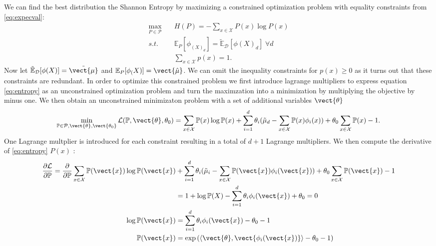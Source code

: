     We can find the best distribution \wrt the Shannon Entropy by maximizing a constrained optimization problem with equality constraints from \eq\ref{eq:expecval}:
    \begin{equation}
        \label{eq:entropy}
        \begin{split}
            \max_{P\in \mathcal{P}} \quad & H(P) = - \sum_{x\in\mathcal{X}} P(x) \log P(x) \\
            s.t. \quad & \mathbb{E}_P[\phi_(X)_d] = \tilde{\mathbb{E}}_{\mathcal{D}}[\phi(X)_d]  \; \forall d\\
            & \sum_{x\in \mathcal{X}} p(x) = 1.
        \end{split}
    \end{equation}
    Now let $\tilde{\mathbb{E}}_{\mathcal{D}}[\phi(X)] = \tilde{\vect{\mu}}$ and $\mathbb{E}_P[\phi_(X)] = \vect{\hat{\mu}}$.
    We can omit the inequality constraints for $p(x) \geq 0$ as it turns out that these constraints are redundant. 
    In order to optimize this constrained problem we first introduce lagrange multipliers to express equation \ref{eq:entropy} as an unconstrained optimization problem and turn the maximzation into a minimization by multiplying the objective by minus one.
    We then obtain an unconstrained minimizaton problem with a set of additional variables $\vect{\theta}$
    \begin{equation}
        \min_{\mathbb{P}\in \mathcal{P}, \vect{\theta}, \vect{\theta_0} } \mathcal{L}(\mathbb{P}, \vect{\theta}, \theta_0) = \sum_{x\in\mathcal{X}} \mathbb{P}(x) \log \mathbb{P}(x) + \sum_{i=1}^d \theta_i (\tilde{\mu}_d - \sum_{x \in \mathcal{X}} \mathbb{P}(x) \phi_i(x)) + \theta_0 \sum_{x\in\mathcal{X}} \mathbb{P}(x) -1.
    \end{equation}
    One Lagrange multplier is introduced for each constraint resulting in a total of $d+1$ Lagrange multipliers.
    We then compute the derivative of \eq\ref{eq:entropy} \wrt $P(x)$ :
    \begin{equation}
        \begin{split}
        \frac{\partial \mathcal{L}}{\partial \mathbb{P}} =  \frac{\partial}{\partial \mathbb{P}} \sum_{x\in\mathcal{X}} \mathbb{P}(\vect{x}) \log \mathbb{P}(\vect{x}) &+ \sum_{i=1}^d \theta_i (\tilde{\mu}_i - \sum_{x \in \mathcal{X}} \mathbb{P}(\vect{x}) \phi_i(\vect{x})) + \theta_0 \sum_{x\in\mathcal{X}} \mathbb{P}(\vect{x}) -1 \\ 
        &= 1 + \log \mathbb{P}(X) - \sum_{i=1}^d \theta_i  \phi_i(\vect{x}) + \theta_0 = 0 \\
        \log \mathbb{P}(\vect{x}) &=  \sum_{i=1}^d \theta_i  \phi_i(\vect{x}) - \theta_0 - 1 \\
        \mathbb{P}(\vect{x}) &= \exp{(\langle\vect{\theta}, \vect{\phi_i(\vect{x})} \rangle - \theta_0 - 1)} \\
    \end{split}
    \end{equation}

